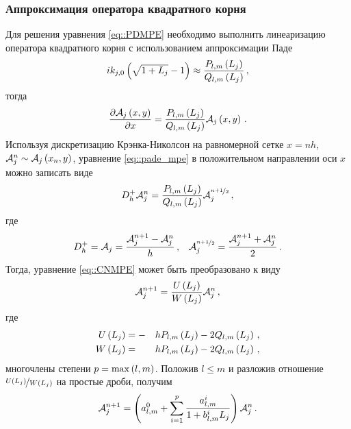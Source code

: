 \documentclass[../document.tex]{subfiles}
\begin{document}
			\subsubsection{Аппроксимация оператора квадратного корня\label{sec::root_wampe}}
				\par Для решения уравнения \eqref{eq::PDMPE} необходимо выполнить линеаризацию оператора квадратного корня с использованием аппроксимации Паде
                \begin{equation}\label{eq::pade_root}
                    ik_{j,0}\left(\sqrt{1+L_j}-1\right)\approx\frac{P_{l,m}\left(L_j\right)}{Q_{l,m}\left(L_j\right)}\,,
                \end{equation}
                тогда
				\begin{equation}\label{eq::pade_mpe}
					\frac{\partial\mathcal{A}_j\left(x,y\right)}{\partial x}=\frac{P_{l,m}\left(L_j\right)}{Q_{l,m}\left(L_j\right)}\mathcal{A}_j\left(x,y\right)\,.
				\end{equation}
				Используя дискретизацию Крэнка-Николсон \cite{crank} на равномерной сетке $x=nh$, $\mathcal{A}_j^n\sim\mathcal{A}_j\left(x_n,y\right)$, уравнение \eqref{eq::pade_mpe} в положительном направлении оси $x$ можно записать виде
				\begin{equation}\label{eq::CNMPE}
					D_h^+\mathcal{A}_j^n=\frac{P_{l,m}\left(L_j\right)}{Q_{l,m}\left(L_j\right)}\mathcal{A}_j^{\nicefrac{n+1}{2}}\,,
				\end{equation}
				где 
				\begin{align*}
					D_h^+=\mathcal{A}_j=\frac{\mathcal{A}_j^{n+1}-\mathcal{A}_j^n}{h}\,,&&\mathcal{A}_j^{\nicefrac{n+1}{2}}=\frac{\mathcal{A}_j^{n+1}+\mathcal{A}_j^n}{2}\,.
				\end{align*}
				Тогда, уравнение \eqref{eq::CNMPE} может быть преобразовано к виду
				\begin{equation}
					\mathcal{A}_j^{n+1}=\frac{U\left(L_j\right)}{W\left(L_j\right)}\mathcal{A}_j^n\,,
				\end{equation}
				где
				\begin{alignat*}{3}
					U\left(L_j\right)&=-&hP_{l,m}\left(L_j\right)-2Q_{l,m}\left(L_j\right)\,,\\
					W\left(L_j\right)&= &hP_{l,m}\left(L_j\right)-2Q_{l,m}\left(L_j\right)\,,
				\end{alignat*}
				многочлены степени $p=\max\left(l,m\right)$. Положив $l\leqslant m$ и разложив отношение $\nicefrac{U\left(L_j\right)}{W\left(L_j\right)}$ на простые дроби, получим
				\begin{equation}\label{eq::dPDMPE}
					\mathcal{A}_j^{n+1}=\left(a_{l,m}^0+\sum\limits_{i=1}^p\frac{a_{l,m}^i}{1+b_{l,m}^iL_j}\right)\mathcal{A}_j^n\,.
				\end{equation}
\end{document}
